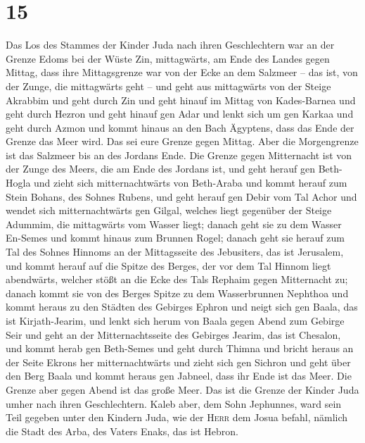 \hypertarget{section-14}{%
\section{15}\label{section-14}}

 Das Los des Stammes der Kinder Juda nach ihren
Geschlechtern war an der Grenze Edoms bei der Wüste Zin, mittagwärts, am
Ende des Landes gegen Mittag,  dass ihre Mittagsgrenze war
von der Ecke an dem Salzmeer -- das ist, von der Zunge, die mittagwärts
geht --  und geht aus mittagwärts von der Steige Akrabbim
und geht durch Zin und geht hinauf im Mittag von Kades-Barnea und geht
durch Hezron und geht hinauf gen Adar und lenkt sich um gen Karkaa
 und geht durch Azmon und kommt hinaus an den Bach
Ägyptens, dass das Ende der Grenze das Meer wird. Das sei eure Grenze
gegen Mittag.  Aber die Morgengrenze ist das Salzmeer bis
an des Jordans Ende. Die Grenze gegen Mitternacht ist von der Zunge des
Meers, die am Ende des Jordans ist,  und geht herauf gen
Beth-Hogla und zieht sich mitternachtwärts von Beth-Araba und kommt
herauf zum Stein Bohans, des Sohnes Rubens,  und geht
herauf gen Debir vom Tal Achor und wendet sich mitternachtwärts gen
Gilgal, welches liegt gegenüber der Steige Adummim, die mittagwärts vom
Wasser liegt; danach geht sie zu dem Wasser En-Semes und kommt hinaus
zum Brunnen Rogel;  danach geht sie herauf zum Tal des
Sohnes Hinnoms an der Mittagsseite des Jebusiters, das ist Jerusalem,
und kommt herauf auf die Spitze des Berges, der vor dem Tal Hinnom liegt
abendwärts, welcher stößt an die Ecke des Tals Rephaim gegen Mitternacht
zu;  danach kommt sie von des Berges Spitze zu dem
Wasserbrunnen Nephthoa und kommt heraus zu den Städten des Gebirges
Ephron und neigt sich gen Baala, das ist Kirjath-Jearim, 
und lenkt sich herum von Baala gegen Abend zum Gebirge Seir und geht an
der Mitternachtsseite des Gebirges Jearim, das ist Chesalon, und kommt
herab gen Beth-Semes und geht durch Thimna  und bricht
heraus an der Seite Ekrons her mitternachtwärts und zieht sich gen
Sichron und geht über den Berg Baala und kommt heraus gen Jabneel, dass
ihr Ende ist das Meer.  Die Grenze aber gegen Abend ist
das große Meer. Das ist die Grenze der Kinder Juda umher nach ihren
Geschlechtern.  Kaleb aber, dem Sohn Jephunnes, ward sein
Teil gegeben unter den Kindern Juda, wie der \textsc{Herr} dem Josua
befahl, nämlich die Stadt des Arba, des Vaters Enaks, das ist Hebron.
